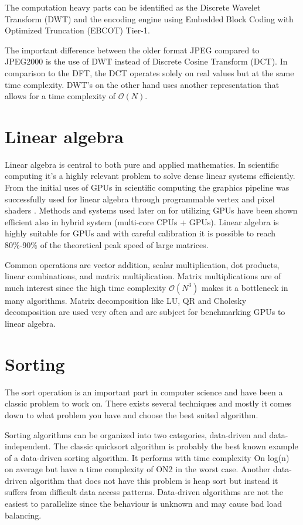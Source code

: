 The computation heavy parts can be identified as the Discrete Wavelet Transform (DWT) and the encoding engine using Embedded Block Coding with Optimized Truncation (EBCOT) Tier-1.

The important difference between the older format JPEG compared to JPEG2000 is the use of DWT instead of Discrete Cosine Transform (DCT). In comparison to the DFT, the DCT operates solely on real values but at the same time complexity. DWT's on the other hand uses another representation that allows for a time complexity of $\mathcal{O}(N)$.

\section{Linear algebra}
Linear algebra is central to both pure and applied mathematics. In scientific computing it's a highly relevant problem to solve dense linear systems efficiently. From the initial uses of GPUs in scientific computing the graphics pipeline was successfully used for linear algebra through programmable vertex and pixel shaders \cite{Kruger2003}. Methods and systems used later on for utilizing GPUs have been shown efficient also in hybrid system (multi-core CPUs + GPUs)\cite{Tomov2010}. Linear algebra is highly suitable for GPUs and with careful calibration it is possible to reach 80\%-90\% of the theoretical peak speed of large matrices\cite{Volkov2008}.

Common operations are vector addition, scalar multiplication, dot products, linear combinations, and matrix multiplication. Matrix multiplications are of much interest since the high time complexity $\mathcal{O}(N^3)$ makes it a bottleneck in many algorithms. Matrix decomposition like LU, QR and Cholesky decomposition are used very often and are subject for benchmarking GPUs to linear algebra\cite{Volkov2008}.

\section{Sorting}
The sort operation is an important part in computer science and have been a classic problem to work on. There exists several techniques and mostly it comes down to what problem you have and choose the best suited algorithm.

Sorting algorithms can be organized into two categories, data-driven and data-independent. The classic quicksort algorithm is probably the best known example of a data-driven sorting algorithm. It performs with time complexity On log(n) on average but have a time complexity of ON2 in the worst case. Another data-driven algorithm that does not have this problem is heap sort but instead it suffers from difficult data access patterns. Data-driven algorithms are not the easiest to parallelize since the behaviour is unknown and may cause bad load balancing.

